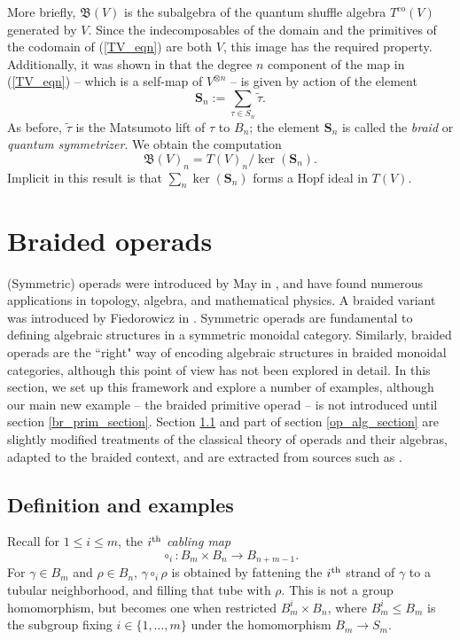 \documentclass[12pt]{article}
\DeclareMathOperator{\co}{co}
\newcommand{\bS} {\mathbf{S}}
\newcommand{\mB}{\mathfrak{B}}
\newcommand{\tautilde}{\widetilde{\tau}}
\newcommand{\beqn}{\begin{equation}}
\newcommand{\eeqn}{\end{equation}}
\newcommand{\nth}{\textsuperscript{th}}
\theoremstyle{plain}
\theoremstyle{definition}
\theoremstyle{remark}
\begin{document}
More briefly, $\mB(V)$ is the subalgebra of the quantum shuffle algebra $T^{\co}(V)$ generated by $V$.  Since the indecomposables of the domain and the primitives of the codomain of (\ref{TV_eqn}) are both $V$, this image has the required property.  Additionally, it was shown in \cite{schauenburg} that the degree $n$ component of the map in (\ref{TV_eqn}) -- which is a self-map of $V^{\otimes n}$ -- is given by action of the element
%
$$\bS_n := \sum_{\tau \in S_n} \tautilde.$$
%
As before, $\tautilde$ is the Matsumoto lift of $\tau$ to $B_n$; the element $\bS_n$ is called the \emph{braid} or \emph{quantum symmetrizer}.  We obtain the computation
%
\beqn \mB(V)_n  = T(V)_n / \ker(\bS_n). \label{nichols_defn_eqn} \eeqn
%
Implicit in this result is that $\sum_n \ker(\bS_n)$ forms a Hopf ideal in $T(V)$.

\section{Braided operads}  \label{br_op_sec}

(Symmetric) operads were introduced by May in \cite{may}, and have found numerous applications in topology, algebra, and mathematical physics.  A braided variant was introduced by Fiedorowicz in \cite{fiedorowicz}.  Symmetric operads are fundamental to defining algebraic structures in a symmetric monoidal category.  Similarly, braided operads are the ``right" way of encoding algebraic structures in braided monoidal categories, although this point of view has not been explored in detail.  In this section, we set up this framework and explore a number of examples, although our main new example -- the braided primitive operad -- is not introduced until section \ref{br_prim_section}.  Section \ref{op_defn_section} and part of section \ref{op_alg_section} are slightly modified treatments of the classical theory of operads and their algebras, adapted to the braided context, and are extracted from sources such as \cite{may, fiedorowicz, markl}. 

\subsection{Definition and examples} \label{op_defn_section}

Recall for $1 \leq i \leq m$, the $i\nth$ \emph{cabling map} 
%
$$\circ_i: B_m \times B_n \to B_{n+m-1}.$$  
%
For $\gamma \in B_m$ and $\rho \in B_n$, $\gamma \circ_i \rho$ is obtained by fattening the $i\nth$ strand of $\gamma$ to a tubular neighborhood, and filling that tube with $\rho$.  This is not a group homomorphism, but becomes one when restricted $B_m^i \times B_n$, where $B_m^i \leq B_m$ is the subgroup fixing $i \in \{1, \dots, m\}$ under the homomorphism $B_m \to S_m$.
\end{document}
